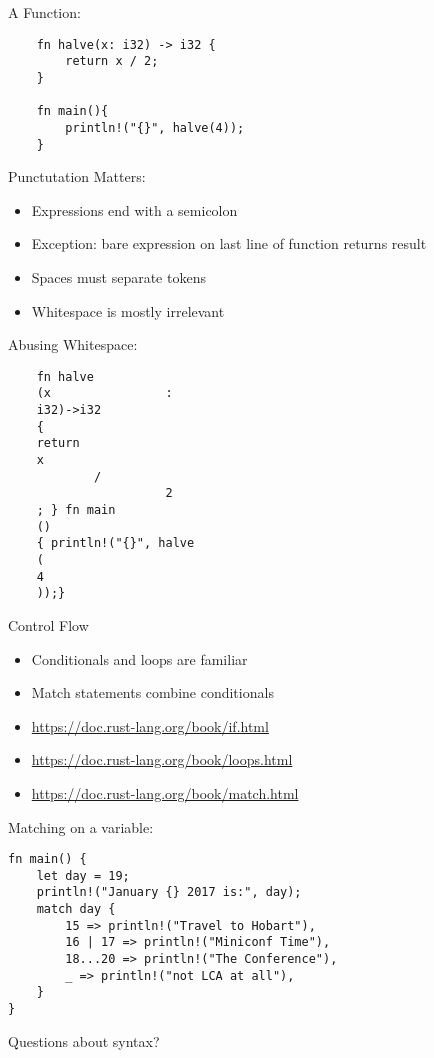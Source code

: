 \documentclass[50pt]{beamer}
\begin{document}
\begin{frame}[fragile]
    A Function:

\begin{verbatim}
    fn halve(x: i32) -> i32 {
        return x / 2;
    }

    fn main(){
        println!("{}", halve(4));
    }
\end{verbatim}

\end{frame}

\begin{frame}
    Punctutation Matters:
    \begin{itemize}
        \item Expressions end with a semicolon
        \item Exception: bare expression on last line of function returns result
        \item Spaces must separate tokens
        \item Whitespace is mostly irrelevant
    \end{itemize}
\end{frame}

\begin{frame}[fragile]
    Abusing Whitespace:

\begin{verbatim}
    fn halve
    (x                :
    i32)->i32
    {
    return
    x
            /
                      2
    ; } fn main
    ()
    { println!("{}", halve
    (
    4
    ));}
\end{verbatim}

\end{frame}

\begin{frame}
    Control Flow
    \begin{itemize}
        \item Conditionals and loops are familiar
        \item Match statements combine conditionals
        \item \url{https://doc.rust-lang.org/book/if.html}
        \item \url{https://doc.rust-lang.org/book/loops.html}
        \item \url{https://doc.rust-lang.org/book/match.html}
    \end{itemize}
\end{frame}

\begin{frame}[fragile]
Matching on a variable:
\begin{verbatim}
fn main() {
    let day = 19;
    println!("January {} 2017 is:", day);
    match day {
        15 => println!("Travel to Hobart"),
        16 | 17 => println!("Miniconf Time"),
        18...20 => println!("The Conference"),
        _ => println!("not LCA at all"),
    }
}
\end{verbatim}
\end{frame}
\begin{frame}
    Questions about syntax?
\end{frame}
\end{document}
